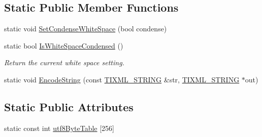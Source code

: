 \subsection*{Static Public Member Functions}
\begin{DoxyCompactItemize}
\item 
static void \hyperlink{class_ti_xml_base_a0f799ec645bfb8d8a969e83478f379c1}{Set\-Condense\-White\-Space} (bool condense)
\item 
static bool \hyperlink{class_ti_xml_base_ad4b1472531c647a25b1840a87ae42438}{Is\-White\-Space\-Condensed} ()
\begin{DoxyCompactList}\small\item\em Return the current white space setting. \end{DoxyCompactList}\item 
static void \hyperlink{class_ti_xml_base_a32ed202562b58de64c7d799ca3c9db98}{Encode\-String} (const \hyperlink{tinyxml_8h_a92bada05fd84d9a0c9a5bbe53de26887}{T\-I\-X\-M\-L\-\_\-\-S\-T\-R\-I\-N\-G} \&str, \hyperlink{tinyxml_8h_a92bada05fd84d9a0c9a5bbe53de26887}{T\-I\-X\-M\-L\-\_\-\-S\-T\-R\-I\-N\-G} $\ast$out)
\end{DoxyCompactItemize}
\subsection*{Static Public Attributes}
\begin{DoxyCompactItemize}
\item 
static const int \hyperlink{class_ti_xml_base_ac8c86058137bdb4b413c3eca58f2d467}{utf8\-Byte\-Table} \mbox{[}256\mbox{]}
\end{DoxyCompactItemize}
